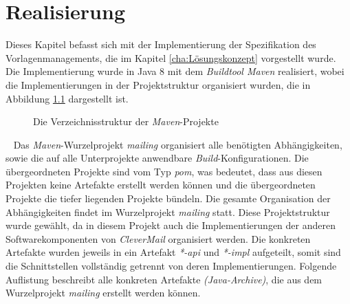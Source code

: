 \chapter{Realisierung}
\label{cha:Realisierung}
Dieses Kapitel befasst sich mit der Implementierung der Spezifikation des Vorlagenmanagements, die im Kapitel \ref{cha:Lösungskonzept} vorgestellt wurde. Die Implementierung wurde in Java 8 mit dem \emph{Buildtool Maven} realisiert, wobei die Implementierungen in der Projektstruktur organisiert wurden, die in Abbildung \ref{fig:minimal-example:frame-dirtree} dargestellt ist.
\begin{figure}[h]
\caption{Die Verzeichnisstruktur der \emph{Maven}-Projekte}
\label{fig:minimal-example:frame-dirtree}
\end{figure}
\ \newline
Das \emph{Maven}-Wurzelprojekt \emph{mailing} organisiert alle benötigten Abhängigkeiten, sowie die auf alle Unterprojekte anwendbare \emph{Build}-Konfigurationen. Die übergeordneten Projekte sind vom Typ \emph{pom}, was bedeutet, dass aus diesen Projekten keine Artefakte erstellt werden können und die übergeordneten Projekte die tiefer liegenden Projekte bündeln. Die gesamte Organisation der Abhängigkeiten findet im Wurzelprojekt \emph{mailing} statt. Diese Projektstruktur wurde gewählt, da in diesem Projekt auch die Implementierungen der anderen Softwarekomponenten von \emph{CleverMail} organisiert werden. 
\newline
\newline
Die konkreten Artefakte wurden jeweils in ein Artefakt \emph{*-api} und \emph{*-impl} aufgeteilt, somit sind die Schnittstellen  vollständig getrennt von deren Implementierungen. 
\newline
\newline
Folgende Auflistung beschreibt alle konkreten Artefakte \emph{(Java-Archive)}, die aus dem Wurzelprojekt \emph{mailing} erstellt werden können.
